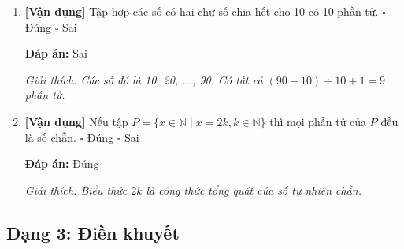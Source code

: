 \documentclass[12pt,a4paper]{article}
\newcommand{\vandung}{\textcolor{vandung}{\textbf{[Vận dụng]}}}
\newcommand{\dapan}[1]{\par\smallskip\textbf{Đáp án:} #1}
\newcommand{\giaithich}[1]{\par\textit{Giải thích: #1}}
\begin{document}
\begin{enumerate}[label=\textbf{Câu \arabic*.},resume]
    \item \vandung{} Tập hợp các số có hai chữ số chia hết cho 10 có 10 phần tử.
    \hfill $\square$ Đúng \quad $\square$ Sai
    \dapan{Sai}
    \giaithich{Các số đó là 10, 20, ..., 90. Có tất cả $(90 - 10) \div 10 + 1 = 9$ phần tử.}

    \item \vandung{} Nếu tập $P = \{x \in \mathbb{N} \mid x = 2k, k \in \mathbb{N}\}$ thì mọi phần tử của $P$ đều là số chẵn.
    \hfill $\square$ Đúng \quad $\square$ Sai
    \dapan{Đúng}
    \giaithich{Biểu thức $2k$ là công thức tổng quát của số tự nhiên chẵn.}
\end{enumerate}

\subsection*{Dạng 3: Điền khuyết}
\end{document}

